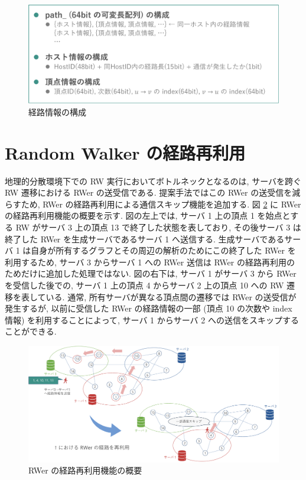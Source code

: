 \begin{figure}[t]
    \centering
    \includegraphics[scale=0.5]{figure/path.pdf}
    \caption{経路情報の構成}
    \label{経路情報の構成}
\end{figure}

\section{Random Walker の経路再利用}\label{Random Walker の経路再利用}

地理的分散環境下での RW 実行においてボトルネックとなるのは, サーバを跨ぐ RW 遷移における RWer の送受信である. 提案手法ではこの RWer の送受信を減らすため, RWer の経路再利用による通信スキップ機能を追加する. 図 \ref{RWer の経路再利用機能の概要} に RWer の経路再利用機能の概要を示す. 図の左上では, サーバ 1 上の頂点 1 を始点とする RW がサーバ 3 上の頂点 13 で終了した状態を表しており, その後サーバ 3 は終了した RWer を生成サーバであるサーバ 1 へ送信する. 生成サーバであるサーバ 1 は自身が所有するグラフとその周辺の解析のためにこの終了した RWer を利用するため, サーバ 3 からサーバ 1 への RWer 送信は RWer の経路再利用のためだけに追加した処理ではない. 図の右下は, サーバ 1 がサーバ 3 から RWer を受信した後での, サーバ 1 上の頂点 4 からサーバ 2 上の頂点 10 への RW 遷移を表している. 通常, 所有サーバが異なる頂点間の遷移では RWer の送受信が発生するが, 以前に受信した RWer の経路情報の一部 (頂点 10 の次数や index 情報) を利用することによって, サーバ 1 からサーバ 2 への送信をスキップすることができる. 

\begin{figure}[t]
    \centering
    \includegraphics[scale=0.5]{figure/cache_gai.pdf}
    \caption{RWer の経路再利用機能の概要}
    \label{RWer の経路再利用機能の概要}
\end{figure}


